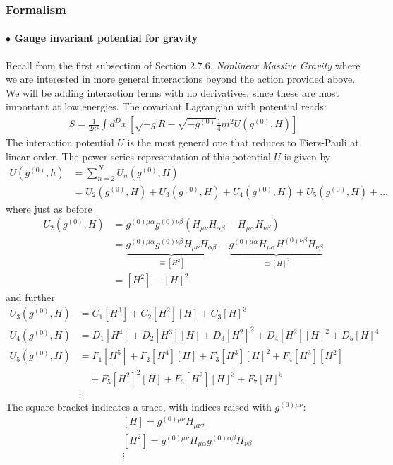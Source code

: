 \documentclass{book}
\theoremstyle{definition}
\newcommand{\nn}{\nonumber}
\newcommand{\al}{\alpha}
\newcommand{\f}[2]{\frac{#1}{#2}}
\newcommand{\lp}{\left(}
\newcommand{\rp}{\right)}
\newcommand{\lb}{\left[}
\newcommand{\rb}{\right]}
\begin{document}
\newpage
\subsubsection{Formalism}
\paragraph{$\bullet$ Gauge invariant potential for gravity}

Recall from the first subsection of Section 2.7.6, \textit{Nonlinear Massive Gravity} where we are interested in more general interactions beyond the action provided above. We will be adding interaction terms with no derivatives, since these are most important at low energies. The covariant Lagrangian with potential reads:
\begin{align}
{S = \f{1}{2\kappa^2}\int d^Dx\, \lb \sqrt{-g}R - \sqrt{-g^{(0)}}\f{1}{4}m^2 U(g^{(0)},H) \rb}
\end{align}
The interaction potential $U$ is the most general one that reduces to Fierz-Pauli at linear order. The power series representation of this potential $U$ is given by
\begin{align}
U(g^{(0)},h) &= \sum^N_{n=2}U_n(g^{(0)},H) \nn\\
&= U_2(g^{(0)},H) + U_3(g^{(0)},H) + U_4(g^{(0)},H) + U_5(g^{(0)},H) + \dots
\end{align}
where just as before
\begin{align}
U_2(g^{(0)},H) &= g^{(0)\mu\alpha}g^{(0)\nu\beta}\lp H_{\mu\nu}H_{\alpha\beta} - H_{\mu\alpha}H_{\nu\beta} \rp   \nn\\
&= \underbrace{g^{(0)\mu\alpha}g^{(0)\nu\beta}H_{\mu\nu}H_{\alpha\beta}}_{\equiv [H^2]} - \underbrace{g^{(0)\mu\alpha}H_{\mu\alpha}H^{(0)\nu\beta}H_{\nu\beta}}_{\equiv [H]^2}\nn\\
&= [H^2] - [H]^2
\end{align}
and further
\begin{align}
U_3(g^{(0)},H) &= C_1[H^3] + C_2[H^2][H] + C_3[H]^3\nn\\
U_4(g^{(0)},H) &= D_1[H^4] + D_2[H^3][H] + D_3[H^2]^2 + D_4[H^2][H]^2 + D_5[H]^4\nn\\
U_5(g^{(0)},H) &= F_1[H^5] + F_2[H^4][H] + F_3[H^3][H]^2 + F_4[H^3][H^2]\nn\\ &\,\,\,\,\,\,+ F_5[H^2]^2[H] + F_6[H^2][H]^3 + F_7[H]^5\nn\\
&\vdots
\end{align}
The square bracket indicates a trace, with indices raised with $g^{(0)\mu\nu}$:
\begin{align}
&[H] = g^{(0)\mu\nu}H_{\mu\nu},\nn\\
&[H^2] = g^{(0)\mu\nu}H_{\mu\al}g^{(0)\alpha\beta}H_{\nu\beta} \nn\\
&\vdots
\end{align}
\end{document}
